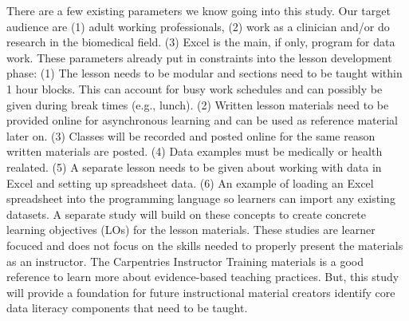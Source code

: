\documentclass[020-persona\_validation.tex]{subfiles}
\begin{document}

    There are a few existing parameters we know going into this study.
    Our target audience are
    (1) adult working professionals,
    (2) work as a clinician and/or do research in the biomedical field.
    (3) Excel is the main, if only, program for data work.
    These parameters already put in constraints into the lesson development phase:
    (1) The lesson needs to be modular and sections need to be taught within 1 hour blocks.
    This can account for busy work schedules and can possibly be given during break times (e.g., lunch).
    (2) Written lesson materials need to be provided online for asynchronous learning and can be used as reference material later on.
    (3) Classes will be recorded and posted online for the same reason written materials are posted.
    (4) Data examples must be medically or health realated.
    (5) A separate lesson needs to be given about working with data in Excel and setting up spreadsheet data.
    (6) An example of loading an Excel spreadsheet into the programming language so learners can import any existing datasets.
    A separate study will build on these concepts to create concrete learning objectives (LOs) for the lesson materials.
    These studies are learner focuced and does not focus on the skills needed to properly present the materials as an instructor.
    The Carpentries Instructor Training materials is a good reference to learn more about evidence-based teaching practices.
    But, this study will provide a foundation for future instructional material creators identify core data literacy components
    that need to be taught.
\end{document}
